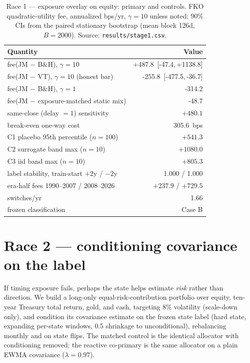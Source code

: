 \documentclass[11pt]{article}
\newcommand{\aidraft}[1]{{\color{aidraftcolor}#1}} %
\newcommand{\aidraft}[1]{#1}
\newcommand{\stabJM}{1.000}          %
\newcommand{\switchesYr}{1.66}
\newcommand{\feeJMBH}{+487.8}
\newcommand{\feeJMBHci}{[-47.4,\,+1138.8]}
\newcommand{\feeJMVT}{-255.8}
\newcommand{\feeJMVTci}{[-477.5,\,-36.7]}
\newcommand{\feeJMBHgone}{-314.2}    %
\newcommand{\feeStaticMix}{-48.7}
\newcommand{\placeboOne}{541.3}      %
\newcommand{\breakeven}{305.6}
\begin{document}
\begin{table}[t]
\centering
\small
\caption{Race 1 --- exposure overlay on equity: primary and controls. FKO quadratic-utility fee,
annualized bps/yr, $\gamma{=}10$ unless noted; 90\% CIs from the paired stationary bootstrap
(mean block 126d, $B{=}2000$). Source: \texttt{results/stage1.csv}.}
\label{tab:exp1}
\begin{tabular}{lr}
\toprule
Quantity & Value \\
\midrule
fee(JM $-$ B\&H), $\gamma{=}10$              & \feeJMBH~\feeJMBHci \\
fee(JM $-$ VT), $\gamma{=}10$ (honest bar)   & \feeJMVT~\feeJMVTci \\
fee(JM $-$ B\&H), $\gamma{=}1$               & \feeJMBHgone \\
fee(JM $-$ exposure-matched static mix)      & \feeStaticMix \\
same-close (delay $=1$) sensitivity          & $+480.1$ \\
break-even one-way cost                       & \breakeven~bps \\
C1 placebo 95th percentile ($n{=}100$)        & $+\placeboOne$ \\
C2 surrogate band max ($n{=}10$)              & $+1080.0$ \\
C3 iid band max ($n{=}10$)                    & $+805.3$ \\
label stability, train-start $+2$y / $-2$y    & \stabJM{} / \stabJM{} \\
era-half fees 1990--2007 / 2008--2026         & $+237.9$ / $+729.5$ \\
switches/yr                                    & \switchesYr{} \\
frozen classification                         & Case B \\
\bottomrule
\end{tabular}
\end{table}




\section{Race 2 --- conditioning covariance on the label}
\label{sec:race2}

\aidraft{%
If timing exposure fails, perhaps the state helps estimate \emph{risk} rather than direction.
We build a long-only equal-risk-contribution portfolio over equity, ten-year Treasury total return,
gold, and cash, targeting 8\% volatility (scale-down only), and condition its covariance estimate on
the frozen state label (hard state, expanding per-state windows, 0.5 shrinkage to unconditional),
rebalancing monthly and on state flips.
The matched control is the identical allocator with conditioning removed; the reactive co-primary is
the same allocator on a plain EWMA covariance ($\lambda{=}0.97$).%
}
\end{document}
